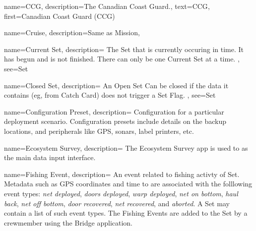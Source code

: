  {
  name=CCG,
  description={The Canadian Coast Guard.},
  text={CCG},
  first={Canadian Coast Guard (CCG)}
}

 {
  name=Cruise,
  description={Same as \gls{Mission}},
}

 {
  name=Current Set,
  description={
    The \gls{Set} that is currently occuring in time.
    It has begun and is not finished.
    There can only be one \gls{Current Set} at a time.
  },
  see={Set}
}

 {
  name=Closed Set,
  description={
    An \gls{Open Set} Can be closed if the data it contains (eg, from \gls{Catch Card}) does not trigger a \gls{Set Flag}.
  },
  see={Set}
}

  {
  name=Configuration Preset,
  description={
    Configuration for a particular deployment scenario. Configuration presets include details on the backup locations, and peripherals like GPS, sonars, label printers, etc.
  }
}






 {
  name=Ecosystem Survey,
  description={
    The Ecosystem Survey app is used to as the main data input interface.
    }
}




 {
  name=Fishing Event,
  description={
    An event related to fishing activty of \gls{Set}.
    Metadata such as GPS coordinates and time to are associated with the folllowing event types:
    \emph{net deployed},
    \emph{doors deployed},
    \emph{warp deployed},
    \emph{net on bottom},
    \emph{haul back},
    \emph{net off bottom},
    \emph{door recovered},
    \emph{net recovered},
    and \emph{aborted}.
    A \gls{Set} may contain a list of such event types.
    The Fishing Events are added to the \gls{Set} by a crewmember using the \gls{Bridge} application.
  }
}


